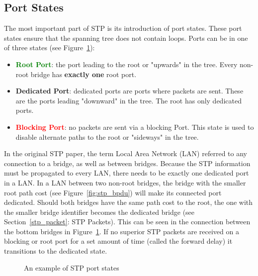 \subsection*{Port States}
The most important part of STP is its introduction of port states.
These port states ensure that the spanning tree does not contain loops.
Ports can be in one of three states (see Figure~\ref{fig:port_states}):
\begin{itemize}
    \item \textcolor{green}{\textbf{Root Port}}: the port leading to the root or "upwards" in the tree.
        Every non-root bridge has \textbf{exactly one} root port.
    \item \textcolor{blue!80}{\textbf{Dedicated Port}}: dedicated ports are ports where packets are sent. These are the ports leading "downward" in the tree.
        The root has only dedicated ports.
    \item \textcolor{red}{\textbf{Blocking Port}}: no packets are sent via a blocking Port.
        This state is used to disable alternate paths to the root or "sideways" in the tree.
\end{itemize}
In the original STP paper\cite{perlman85}, the term Local Area Network (LAN) referred to any connection to a bridge, as well as between bridges.
Because the STP information must be propagated to every LAN, there needs to be exactly one dedicated port in a LAN.
In a LAN between two non-root bridges, the bridge with the smaller root path cost (see Figure~\ref{fig:stp_bpdu}) will make its connected port dedicated.
Should both bridges have the same path cost to the root, the one with the smaller bridge identifier becomes the dedicated bridge (see Section~\ref{stp_packet}: STP Packets).
This can be seen in the connection between the bottom bridges in Figure~\ref{fig:port_states}.
If no superior STP packets are received on a blocking or root port for a set amount of time (called the forward delay) it transitions to the dedicated state.
\begin{figure}[h]
    \centering
    \caption{An example of STP port states}
    \label{fig:port_states}
\end{figure}

